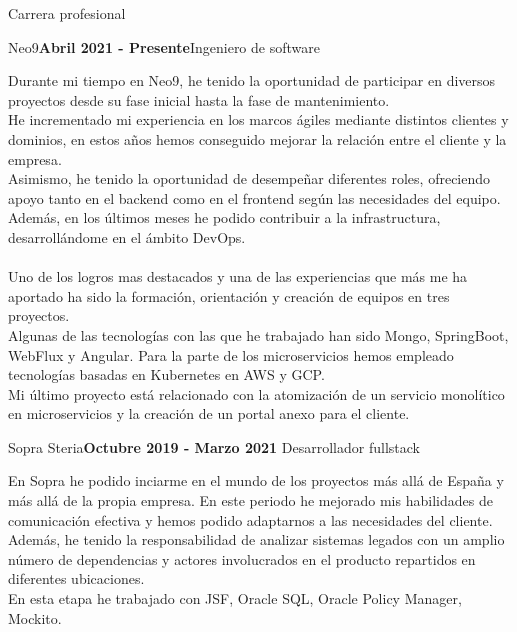 \documentclass{resume}
\begin{document}
\begin{rSection}{Carrera profesional}

\begin{rSubsection}{Neo9}{\bf \sffamily Abril 2021 - Presente}{Ingeniero de software}{}
\rmfamily
\item Durante mi tiempo en Neo9, he tenido la oportunidad de participar en diversos proyectos desde su fase inicial hasta la fase de mantenimiento.\\
He incrementado mi experiencia en los marcos ágiles mediante distintos clientes y dominios, en estos años hemos conseguido mejorar la relación entre el cliente y la empresa.\\
Asimismo, he tenido la oportunidad de desempeñar diferentes roles, ofreciendo apoyo tanto en el backend como en el frontend según las necesidades del equipo. Además, en los últimos meses he podido contribuir a la infrastructura, desarrollándome en el ámbito DevOps.\\
\\
Uno de los logros mas destacados y una de las experiencias que más me ha aportado ha sido la formación, orientación y creación de equipos en tres proyectos.\\
Algunas de las tecnologías con las que he trabajado han sido Mongo, SpringBoot, WebFlux y Angular. Para la parte de los microservicios hemos empleado tecnologías basadas en Kubernetes en AWS y GCP.\\
Mi último proyecto está relacionado con la atomización de un servicio monolítico en microservicios y la creación de un portal anexo para el cliente.
\end{rSubsection}

\begin{rSubsection}{Sopra Steria}{\bf \sffamily Octubre 2019 - Marzo 2021 }{Desarrollador fullstack}{}
\rmfamily
\item En Sopra he podido inciarme en el mundo de los proyectos más allá de España y más allá de la propia empresa. En este periodo he mejorado mis habilidades de comunicación efectiva y hemos podido adaptarnos a las necesidades del cliente.\\
Además, he tenido la responsabilidad de analizar sistemas legados con un amplio número de dependencias y actores involucrados en el producto repartidos en diferentes ubicaciones.\\
En esta etapa he trabajado con JSF, Oracle SQL, Oracle Policy Manager, Mockito.
\end{rSubsection}


\end{rSection}
\end{document}
